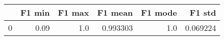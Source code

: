 \begin{tabular}{lrrrrr}
\toprule
{} &  F1 min &  F1 max &   F1 mean &  F1 mode &    F1 std \\
\midrule
0 &    0.09 &     1.0 &  0.993303 &      1.0 &  0.069224 \\
\bottomrule
\end{tabular}
